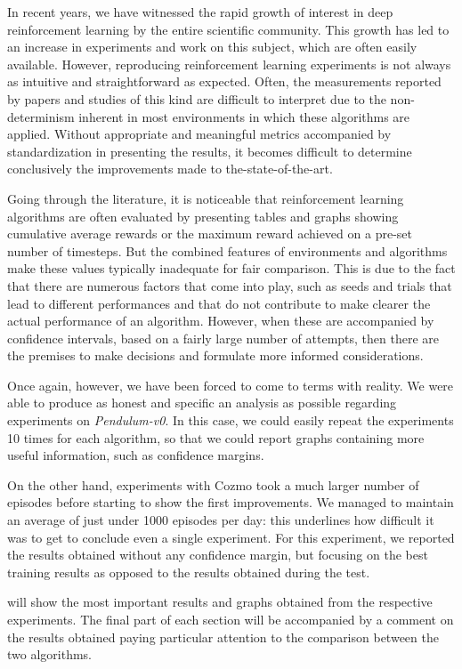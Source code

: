 In recent years, we have witnessed the rapid growth of interest in deep reinforcement learning by the entire scientific community.
This growth has led to an increase in experiments and work on this subject, which are often easily available.
However, reproducing reinforcement learning experiments is not always as intuitive and straightforward as expected.
Often, the measurements reported by papers and studies of this kind are difficult to interpret due to the non-determinism inherent in most environments in which these algorithms are applied.
Without appropriate and meaningful metrics accompanied by standardization in presenting the results, it becomes difficult to determine conclusively the improvements made to the-state-of-the-art.

Going through the literature, it is noticeable that reinforcement learning algorithms are often evaluated by presenting tables and graphs showing cumulative average rewards or the maximum reward achieved on a pre-set number of timesteps.
But the combined features of environments and algorithms make these values typically inadequate for fair comparison.
This is due to the fact that there are numerous factors that come into play, such as seeds and trials that lead to different performances and that do not contribute to make clearer the actual performance of an algorithm.
However, when these are accompanied by confidence intervals, based on a fairly large number of attempts, then there are the premises to make decisions and formulate more informed considerations.

Once again, however, we have been forced to come to terms with reality.
We were able to produce as honest and specific an analysis as possible regarding experiments on \textit{Pendulum-v0}.
In this case, we could easily repeat the experiments 10 times for each algorithm, so that we could report graphs containing more useful information, such as confidence margins.

On the other hand, experiments with Cozmo took a much larger number of episodes before starting to show the first improvements.
We managed to maintain an average of just under 1000 episodes per day: this underlines how difficult it was to get to conclude even a single experiment.
For this experiment, we reported the results obtained without any confidence margin, but focusing on the best training results as opposed to the results obtained during the test.

 will show the most important results and graphs obtained from the respective experiments.
The final part of each section will be accompanied by a comment on the results obtained paying particular attention to the comparison between the two algorithms.

